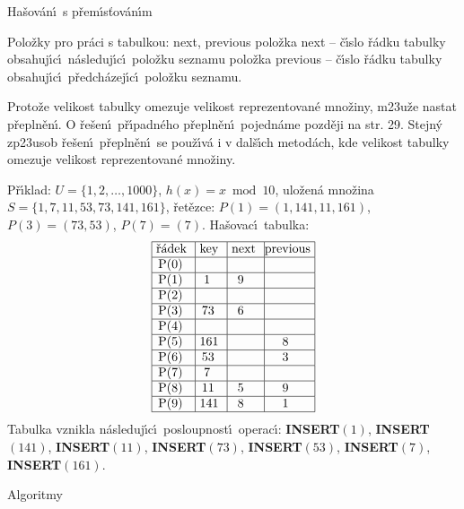 \documentclass[a4paper,12pt]{article}
\begin{document}
\heading
Ha\v sov\'an\'\i\ s p\v rem\'\i s\v tov\'an\'\i m
\endheading

\flushpar Polo\v zky pro pr\'aci s tabulkou: next, previous\newline 
\phantom{---}polo\v zka next -- \v c\'\i slo \v r\'adku tabulky 
obsahuj\'\i c\'\i\ n\'asleduj\'\i c\'\i\ polo\v z\-ku seznamu\newline 
\phantom{---}polo\v zka previous -- \v c\'\i slo \v r\'adku tabulky obsahuj\'\i c\'\i\ 
p\v redch\'azej\'\i c\'\i\ polo\v zku seznamu.
\medskip

\flushpar Proto\v ze velikost tabulky omezuje velikost reprezentovan\'e mno\v ziny, m\accent23u\v ze nastat p\v repln\v en\'\i. O \v re\v sen\'\i\ 
p\v r\'\i padn\'eho p\v repln\v en\'\i\ pojedn\'ame pozd\v eji na str. 29. Stejn\'y zp\accent23usob \v re\v sen\'\i\ p\v repln\v en\'\i\ se pou\v z\'\i v\'a i v dal\v s\'\i ch metod\'ach, kde velikost tabulky omezuje velikost reprezentovan\'e mno\v ziny.
\medskip

\flushpar P\v r\'\i klad: $U=\{1,2,\dots,1000\}$, $h(x)=x\bmod10$,\newline 
ulo\v zen\'a mno\v zina $S=\{1,7,11,53,73,141,161\}$,\newline 
\v ret\v ezce: $P(1)=(1,141,11,161)$, 
$P(3)=(73,53)$, $P(7)=(7)$.\newline 
Ha\v sovac\'\i\ tabulka:
$$\vtop{\offinterlineskip\halign {\strut\vrule\ # & \vrule\ # & \vrule\ # & \vrule \hfil # \hfil \vrule\cr\noalign{\hrule}\v r\'adek & key & next & previous\hfil \cr\noalign{\hrule}P(0) & & & \hfill \cr\noalign{\hrule}P(1) & 1 & 9 & \hfill \cr\noalign{\hrule}P(2) & & & \hfill \cr\noalign{\hrule}P(3) & 73 & 6 & \hfill \cr\noalign{\hrule}P(4) & & &\hfill \cr\noalign{\hrule}P(5) & 161 & & 8 \cr\noalign{\hrule}P(6) & 53 & & 3 \cr\noalign{\hrule}P(7) & 7 & &\hfill \cr\noalign{\hrule}P(8) & 11 & 5 & 9 \cr\noalign{\hrule}P(9) & 141 & 8 & 1 \cr\noalign{\hrule}}}$$
\flushpar Tabulka vznikla n\'asleduj\'\i c\'\i\ posloupnost\'\i\ 
operac\'\i :\newline 
{\bf INSERT$(1)$}, {\bf INSERT$(141)$}, {\bf INSERT$(11)$}, {\bf INSERT$
(73)$}, 
{\bf INSERT$(53)$},\newline 
{\bf INSERT$(7)$}, {\bf INSERT$(161)$}. 
\medskip

\subhead
Algoritmy
\endsubhead
\smallskip
\end{document}
